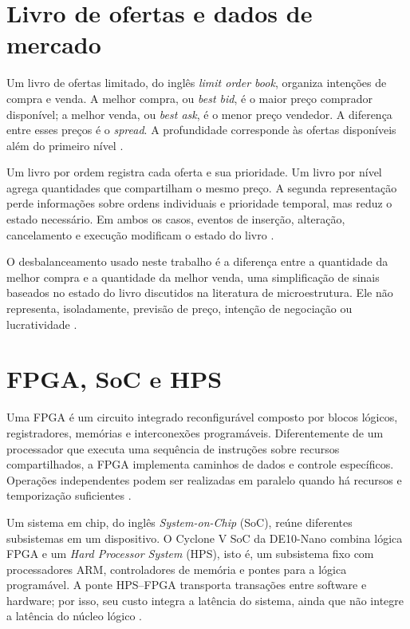 \section{Livro de ofertas e dados de mercado}\label{sec:livroOfertas}

Um livro de ofertas limitado, do inglês \textit{limit order book}, organiza intenções de compra e venda. A melhor compra, ou \textit{best bid}, é o maior preço comprador disponível; a melhor venda, ou \textit{best ask}, é o menor preço vendedor. A diferença entre esses preços é o \textit{spread}. A profundidade corresponde às ofertas disponíveis além do primeiro nível \cite{Gould2013}.

Um livro por ordem registra cada oferta e sua prioridade. Um livro por nível agrega quantidades que compartilham o mesmo preço. A segunda representação perde informações sobre ordens individuais e prioridade temporal, mas reduz o estado necessário. Em ambos os casos, eventos de inserção, alteração, cancelamento e execução modificam o estado do livro \cite{Gould2013,Cont2010}.

O desbalanceamento usado neste trabalho é a diferença entre a quantidade da melhor compra e a quantidade da melhor venda, uma simplificação de sinais baseados no estado do livro discutidos na literatura de microestrutura. Ele não representa, isoladamente, previsão de preço, intenção de negociação ou lucratividade \cite{Gould2013,Cont2010}.

\section{FPGA, SoC e HPS}\label{sec:fpgaSoc}

Uma FPGA é um circuito integrado reconfigurável composto por blocos lógicos, registradores, memórias e interconexões programáveis. Diferentemente de um processador que executa uma sequência de instruções sobre recursos compartilhados, a FPGA implementa caminhos de dados e controle específicos. Operações independentes podem ser realizadas em paralelo quando há recursos e temporização suficientes \cite{HarrisHarris2013,PattersonHennessy2017}.

Um sistema em chip, do inglês \textit{System-on-Chip} (SoC), reúne diferentes subsistemas em um dispositivo. O Cyclone V SoC da DE10-Nano combina lógica FPGA e um \textit{Hard Processor System} (HPS), isto é, um subsistema fixo com processadores ARM, controladores de memória e pontes para a lógica programável. A ponte HPS--FPGA transporta transações entre software e hardware; por isso, seu custo integra a latência do sistema, ainda que não integre a latência do núcleo lógico \cite{IntelCycloneV,TerasicDE10Nano,IntelSoCFPGADesignGuidelines}.

